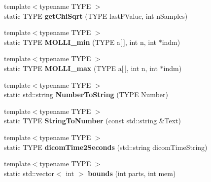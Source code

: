 \begin{DoxyCompactItemize}
\item 
\hypertarget{class_k_w_util_a2e55b0bcf1bbf1155654b748a7064cbf}{{\footnotesize template$<$typename T\-Y\-P\-E $>$ }\\static T\-Y\-P\-E {\bfseries get\-Chi\-Sqrt} (T\-Y\-P\-E last\-F\-Value, int n\-Samples)}\label{class_k_w_util_a2e55b0bcf1bbf1155654b748a7064cbf}

\item 
\hypertarget{class_k_w_util_a6401111c5ce49eb97e1c79bae84b3868}{{\footnotesize template$<$typename T\-Y\-P\-E $>$ }\\static T\-Y\-P\-E {\bfseries M\-O\-L\-L\-I\-\_\-min} (T\-Y\-P\-E a\mbox{[}$\,$\mbox{]}, int n, int $\ast$indm)}\label{class_k_w_util_a6401111c5ce49eb97e1c79bae84b3868}

\item 
\hypertarget{class_k_w_util_af0fee5e9d89e7c029c346804480d5832}{{\footnotesize template$<$typename T\-Y\-P\-E $>$ }\\static T\-Y\-P\-E {\bfseries M\-O\-L\-L\-I\-\_\-max} (T\-Y\-P\-E a\mbox{[}$\,$\mbox{]}, int n, int $\ast$indm)}\label{class_k_w_util_af0fee5e9d89e7c029c346804480d5832}

\item 
\hypertarget{class_k_w_util_a10aaa83c83c801ef07c95a29e1acdc4e}{{\footnotesize template$<$typename T\-Y\-P\-E $>$ }\\static std\-::string {\bfseries Number\-To\-String} (T\-Y\-P\-E Number)}\label{class_k_w_util_a10aaa83c83c801ef07c95a29e1acdc4e}

\item 
\hypertarget{class_k_w_util_adea4c36750f518d1f2c90af14742a0f6}{{\footnotesize template$<$typename T\-Y\-P\-E $>$ }\\static T\-Y\-P\-E {\bfseries String\-To\-Number} (const std\-::string \&Text)}\label{class_k_w_util_adea4c36750f518d1f2c90af14742a0f6}

\item 
\hypertarget{class_k_w_util_a21813a6377e55fa15c70f64afb2feb51}{{\footnotesize template$<$typename T\-Y\-P\-E $>$ }\\static T\-Y\-P\-E {\bfseries dicom\-Time2\-Seconds} (std\-::string dicom\-Time\-String)}\label{class_k_w_util_a21813a6377e55fa15c70f64afb2feb51}

\item 
\hypertarget{class_k_w_util_a498350d10204849240a945ea682ecc98}{{\footnotesize template$<$typename T\-Y\-P\-E $>$ }\\static std\-::vector$<$ int $>$ {\bfseries bounds} (int parts, int mem)}\label{class_k_w_util_a498350d10204849240a945ea682ecc98}


\end{DoxyCompactItemize}
